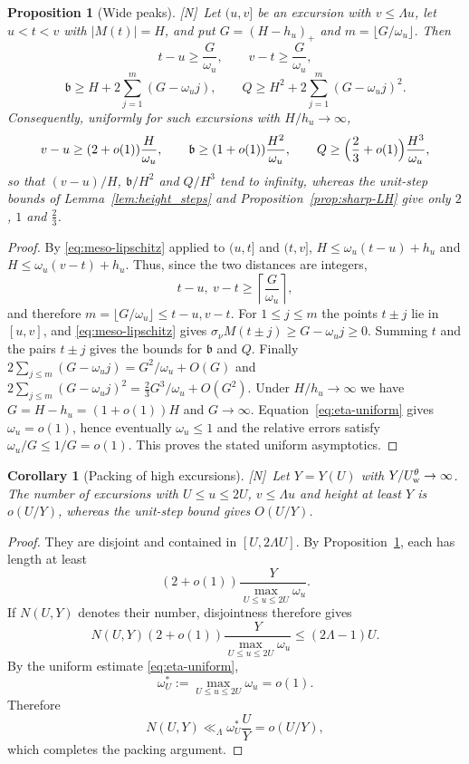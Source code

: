 \documentclass[11pt]{amsart}
\numberwithin{equation}{section}
\theoremstyle{plain}
\newtheorem{proposition}[theorem]{Proposition}
\newtheorem{corollary}[theorem]{Corollary}
\theoremstyle{definition}
\theoremstyle{remark}
\newcommand{\tagN}{\textup{[N]}}
\begin{document}
\begin{proposition}[Wide peaks]
\label{prop:wide-peaks}
\tagN\ Let $(u,v]$ be an excursion with $v\le\Lambda u$, let $u<t<v$ with
$|M(t)|=H$, and put $G=(H-h_u)_+$ and $m=\lfloor G/\omega_u\rfloor$. Then
\[
t-u\ge\frac G{\omega_u},\qquad v-t\ge\frac G{\omega_u},
\]
\[
\mathfrak b\ge H+2\sum_{j=1}^m(G-\omega_uj),\qquad
Q\ge H^2+2\sum_{j=1}^m(G-\omega_uj)^2 .
\]
Consequently, uniformly for such excursions with $H/h_u\to\infty$,
\[
v-u\ge(2+o(1))\frac H{\omega_u},\qquad
\mathfrak b\ge(1+o(1))\frac{H^2}{\omega_u},\qquad
Q\ge\Bigl(\frac23+o(1)\Bigr)\frac{H^3}{\omega_u},
\]
so that $(v-u)/H$, $\mathfrak b/H^2$ and $Q/H^3$ tend to infinity, whereas the
unit-step bounds of Lemma~\ref{lem:height_steps} and
Proposition~\ref{prop:sharp-LH} give only $2$, $1$ and $\frac23$.
\end{proposition}

\begin{proof}
By \eqref{eq:meso-lipschitz} applied to $(u,t]$ and $(t,v]$,
$H\le\omega_u(t-u)+h_u$ and $H\le\omega_u(v-t)+h_u$.  Thus, since the two
distances are integers,
\[
 t-u,\ v-t\ge\left\lceil\frac{G}{\omega_u}\right\rceil,
\]
and therefore $m=\lfloor G/\omega_u\rfloor\le t-u,v-t$.  For
$1\le j\le m$ the points $t\pm j$ lie in $[u,v]$, and \eqref{eq:meso-lipschitz} gives
$\sigma_\nu M(t\pm j)\ge G-\omega_uj\ge0$. Summing $t$ and the pairs $t\pm j$
gives the bounds for $\mathfrak b$ and $Q$. Finally
$2\sum_{j\le m}(G-\omega_uj)=G^2/\omega_u+O(G)$ and
$2\sum_{j\le m}(G-\omega_uj)^2=\frac23G^3/\omega_u+O(G^2)$. Under
$H/h_u\to\infty$ we have $G=H-h_u=(1+o(1))H$ and $G\to\infty$.
Equation~\eqref{eq:eta-uniform} gives $\omega_u=o(1)$, hence eventually
$\omega_u\le1$ and the relative errors satisfy $\omega_u/G\le1/G=o(1)$.
This proves the stated uniform asymptotics.
\end{proof}

\begin{corollary}[Packing of high excursions]
\label{cor:packing}
\tagN\ Let $Y=Y(U)$ with $Y/U^\theta_{\rm w}\to\infty$. The number of excursions with
$U\le u\le2U$, $v\le\Lambda u$ and height at least $Y$ is
$o(U/Y)$, whereas the unit-step bound gives $O(U/Y)$.
\end{corollary}

\begin{proof}
They are disjoint and contained in $[U,2\Lambda U]$. By
Proposition~\ref{prop:wide-peaks}, each has length at least
\[
 (2+o(1))\frac{Y}{\max_{U\le u\le2U}\omega_u}.
\]
If $N(U,Y)$ denotes their number, disjointness therefore gives
\[
 N(U,Y)(2+o(1))\frac{Y}{\max_{U\le u\le2U}\omega_u}
 \le (2\Lambda-1)U.
\]
By the uniform estimate \eqref{eq:eta-uniform},
\[
\omega_U^*:=\max_{U\le u\le2U}\omega_u=o(1).
\]
Therefore
\[
N(U,Y)\ll_\Lambda \omega_U^*\frac{U}{Y}=o(U/Y),
\]
which completes the packing argument.
\end{proof}
\end{document}
